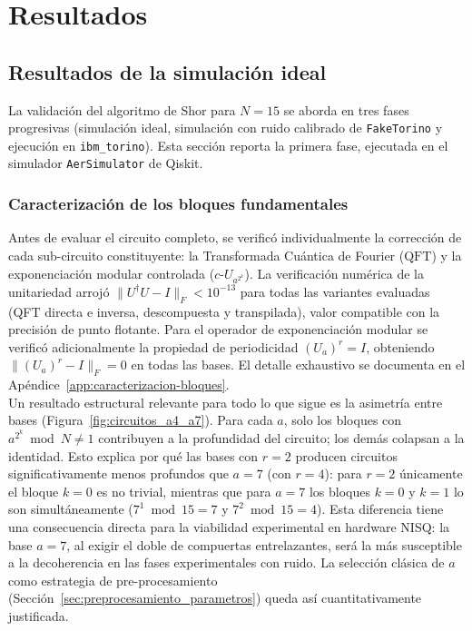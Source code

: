 \documentclass[12pt, spanish]{book}
\begin{document}
\chapter{Resultados}
\label{chap:resultados}

\section{Resultados de la simulación ideal}
\label{sec:resultados_ideal}

La validación del algoritmo de Shor para $N = 15$ se aborda en tres fases progresivas (simulación ideal, simulación con ruido calibrado de \texttt{FakeTorino} y ejecución en \texttt{ibm\_torino}). Esta sección reporta la primera fase, ejecutada en el simulador \texttt{AerSimulator} de Qiskit.

\subsection{Caracterización de los bloques fundamentales}
\label{sec:caracterizacion_bloques}

Antes de evaluar el circuito completo, se verificó individualmente la corrección de cada sub-circuito constituyente: la Transformada Cuántica de Fourier ($\mathrm{QFT}$) y la exponenciación modular controlada ($c$-$U_{a^{2^k}}$). La verificación numérica de la unitariedad arrojó $\lVert U^{\dagger} U - I \rVert_F < 10^{-13}$ para todas las variantes evaluadas (QFT directa e inversa, descompuesta y transpilada), valor compatible con la precisión de punto flotante. Para el operador de exponenciación modular se verificó adicionalmente la propiedad de periodicidad $(U_a)^r = I$, obteniendo $\lVert (U_a)^r - I \rVert_F = 0$ en todas las bases. El detalle exhaustivo se documenta en el Apéndice~\ref{app:caracterizacion-bloques}.\\

Un resultado estructural relevante para todo lo que sigue es la asimetría entre bases (Figura~\ref{fig:circuitos_a4_a7}). Para cada $a$, solo los bloques con $a^{2^k} \bmod N \neq 1$ contribuyen a la profundidad del circuito; los demás colapsan a la identidad. Esto explica por qué las bases con $r = 2$ producen circuitos significativamente menos profundos que $a = 7$ (con $r = 4$): para $r = 2$ únicamente el bloque $k = 0$ es no trivial, mientras que para $a = 7$ los bloques $k = 0$ y $k = 1$ lo son simultáneamente ($7^1 \bmod 15 = 7$ y $7^2 \bmod 15 = 4$). Esta diferencia tiene una consecuencia directa para la viabilidad experimental en hardware NISQ: la base $a = 7$, al exigir el doble de compuertas entrelazantes, será la más susceptible a la decoherencia en las fases experimentales con ruido. La selección clásica de $a$ como estrategia de pre-procesamiento (Sección~\ref{sec:preprocesamiento_parametros}) queda así cuantitativamente justificada.
\end{document}
